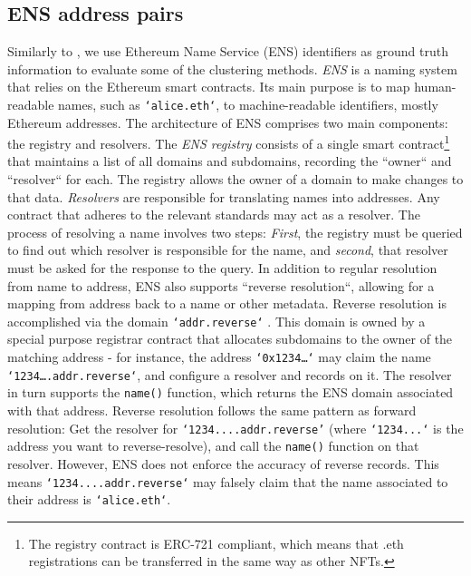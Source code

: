 \documentclass[12pt,a4paper,titlepage,oneside,english]{article}
\begin{document}
\subsection{ENS address pairs}
\label{sec:ens}
Similarly to \cite{Beres2020}, we use Ethereum Name Service (ENS) identifiers as ground truth information to evaluate some of the clustering methods.\newline
\textit{ENS} is a naming system that relies on the Ethereum smart contracts. Its main purpose is to map human-readable names, such as \texttt{`alice.eth`}, to machine-readable identifiers, mostly Ethereum addresses. The architecture of ENS comprises two main components: the registry and resolvers. \newline
The \textit{ENS registry} consists of a single smart contract\footnote{The registry contract is ERC-721 compliant, which means that .eth registrations can be transferred in the same way as other NFTs.} that maintains a list of all domains and subdomains, recording the ``owner`` and ``resolver`` for each. The registry allows the owner of a domain to make changes to that data. \citep{ENSdocs} %
\newline
\textit{Resolvers} are responsible for %
 translating names into addresses. Any contract that adheres to the relevant standards may act as a resolver. The process of resolving a name involves two steps: \textit{First}, the registry must be queried to find out which resolver is responsible for the name, and \textit{second}, that resolver must be asked for the response to the query. \newline
In addition to regular resolution from name to address, ENS also supports ``reverse resolution``, allowing for a mapping from address back to a name or other metadata. Reverse resolution is accomplished via the %
 domain \texttt{`addr.reverse`}%
. This domain is owned by a special purpose registrar contract that allocates subdomains to the owner of the matching address - for instance, the address \texttt{`0x1234\dots`} may claim the name \texttt{`1234\dots.addr.reverse`}, and configure a resolver and records on it. The resolver in turn supports the \texttt{name()} function, which returns the ENS domain associated with that address.\newline
 Reverse resolution %
 follows the same pattern as forward resolution: Get the resolver for \texttt{`1234....addr.reverse'} (where \texttt{`1234...`} is the address you want to reverse-resolve), and call the \texttt{name()} function on that resolver. However, ENS does not enforce the accuracy of reverse records. This means \texttt{`1234....addr.reverse`} may falsely claim that the name associated to their address is \texttt{`alice.eth`}. 
 
\end{document}
